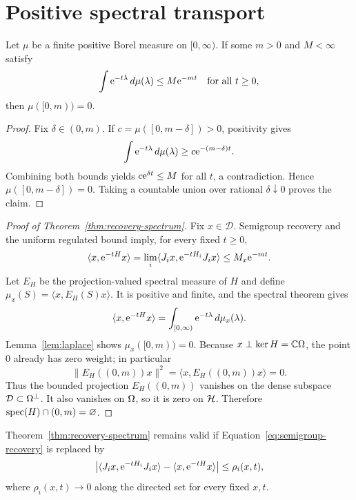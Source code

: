 \section{Positive spectral transport}
\label{app:spectral}

\begin{lemma}
\label{lem:laplace}
Let $\mu$ be a finite positive Borel measure on $[0,\infty)$.  If some
$m>0$ and $M<\infty$ satisfy
\[
 \int\mathrm e^{-t\lambda}\,d\mu(\lambda)\leq M\mathrm e^{-mt}
 \quad\text{for all }t\geq0,
\]
then $\mu([0,m))=0$.
\end{lemma}

\begin{proof}
Fix $\delta\in(0,m)$.  If
$c=\mu([0,m-\delta])>0$, positivity gives
\[
 \int\mathrm e^{-t\lambda}\,d\mu(\lambda)
 \geq c\mathrm e^{-(m-\delta)t}.
\]
Combining both bounds yields $c\mathrm e^{\delta t}\leq M$ for all $t$, a
contradiction.  Hence $\mu([0,m-\delta])=0$.  Taking a countable union over
rational $\delta\downarrow0$ proves the claim.
\end{proof}

\begin{proof}[Proof of Theorem~\ref{thm:recovery-spectrum}]
Fix $x\in\mathcal D$.  Semigroup recovery and the uniform regulated bound
imply, for every fixed $t\geq0$,
\[
 \langle x,\mathrm e^{-tH}x\rangle
 =\lim_i\langle J_i x,\mathrm e^{-tH_i}J_i x\rangle
 \leq M_x\mathrm e^{-mt}.
\]
Let $E_H$ be the projection-valued spectral measure of $H$ and define
$\mu_x(S)=\langle x,E_H(S)x\rangle$.  It is positive and finite, and the
spectral theorem gives
\[
 \langle x,\mathrm e^{-tH}x\rangle
 =\int_{[0,\infty)}\mathrm e^{-t\lambda}\,d\mu_x(\lambda).
\]
Lemma~\ref{lem:laplace} shows $\mu_x([0,m))=0$.  Because
$x\perp\ker H=\mathbb C\Omega$, the point $0$ already has zero weight; in
particular
\[
 \|E_H((0,m))x\|^2=\langle x,E_H((0,m))x\rangle=0.
\]
Thus the bounded projection $E_H((0,m))$ vanishes on the dense subspace
$\mathcal D\subset\Omega^\perp$.  It also vanishes on $\Omega$, so it is zero on
$\mathcal H$.  Therefore $\operatorname{spec}(H)\cap(0,m)=\varnothing$.
\end{proof}

\begin{proposition}
\label{prop:error-recovery}
Theorem~\ref{thm:recovery-spectrum} remains valid if
Equation~\eqref{eq:semigroup-recovery} is replaced by
\[
 \left|\langle J_i x,\mathrm e^{-tH_i}J_i x\rangle-
 \langle x,\mathrm e^{-tH}x\rangle\right|\leq\rho_i(x,t),
\]
where $\rho_i(x,t)\to0$ along the directed set for every fixed $x,t$.
\end{proposition}

